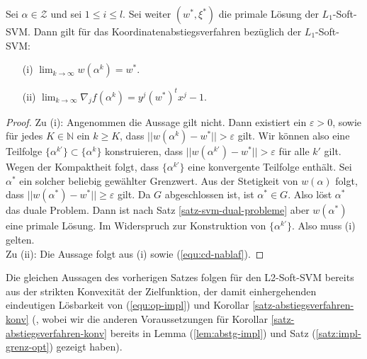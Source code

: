 \begin{lemma}
Sei $\alpha \in \mathcal{Z}$ und sei $1 \leq i \leq l$. Sei weiter $(w^*, \xi^*)$ die primale Lösung der $L_1$-Soft-SVM. Dann gilt für das Koordinatenabstiegsverfahren bezüglich der $L_1$-Soft-SVM:
\begin{itemize}
\item[(i)] $\lim_{k \rightarrow \infty} w(\alpha^k) = w^*$.
\item[(ii)] $\lim_{k \rightarrow \infty} \nabla_j f(\alpha^k) = y^j (w^*)^t x^j -1$.
\end{itemize}
\end{lemma}
\begin{proof}
Zu (i): Angenommen die Aussage gilt nicht.  Dann existiert ein $\varepsilon > 0$, sowie für jedes $K \in \mathbb{N}$ ein $k \geq K$, dass $||w(\alpha^k)-w^*|| > \varepsilon$ gilt. Wir können also eine Teilfolge $\{\alpha^{k'}\} \subset \{\alpha^{k}\}$ konstruieren, dass  $||w(\alpha^{k'})-w^*|| > \varepsilon$ für alle $k'$ gilt. Wegen der Kompaktheit folgt, dass $\{\alpha^{k'}\}$ eine konvergente Teilfolge enthält. Sei $\alpha^*$ ein solcher beliebig gewählter Grenzwert. Aus der Stetigkeit von $w(\alpha)$ folgt, dass $||w(\alpha^*)-w^*||  \geq \varepsilon$ gilt. Da $G$ abgeschlossen ist, ist $\alpha^* \in G$. Also löst $\alpha^*$ das duale Problem. Dann ist nach Satz \ref{satz-svm-dual-probleme} aber $w(\alpha^*)$ eine primale Lösung. Im Widerspruch zur Konstruktion von $\{\alpha^{k'}\}$. Also muss (i) gelten. \\
Zu (ii): Die Aussage folgt aus (i) sowie (\ref{equ:cd-nablaf}).
\end{proof}

Die gleichen Aussagen des vorherigen Satzes folgen für den L2-Soft-SVM bereits aus der strikten Konvexität der Zielfunktion, der damit einhergehenden eindeutigen Lösbarkeit von (\ref{equ:op-impl}) und Korollar \ref{satz-abstiegsverfahren-konv} (, wobei wir die anderen Voraussetzungen für Korollar \ref{satz-abstiegsverfahren-konv} bereits in Lemma (\ref{lem:abstg-impl}) und Satz (\ref{satz:impl-grenz-opt}) gezeigt haben).


